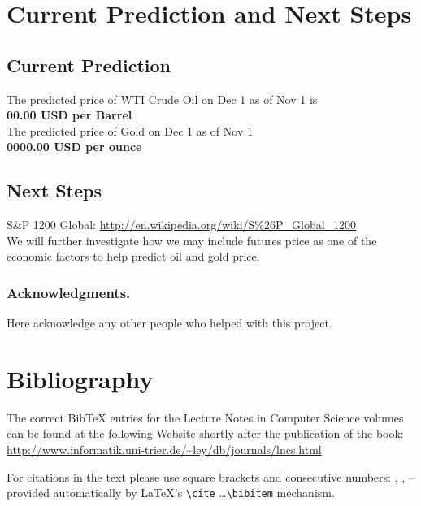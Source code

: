 \documentclass[runningheads]{llncs}
\begin{document}
\newpage

\section{Current Prediction and Next Steps}

\subsection {Current Prediction}
\noindent The predicted price of WTI Crude Oil on Dec 1 as of Nov 1 is \\
\textbf{00.00 USD per Barrel} \\

\noindent The predicted price of Gold on Dec 1 as of Nov 1 \\
\textbf{0000.00 USD per ounce} \\

\subsection {Next Steps}

S\&P 1200 Global: \url {http://en.wikipedia.org/wiki/S%26P_Global_1200} \\

\noindent We will further investigate how we may include futures price as one of the economic factors to help predict oil and gold price. \\


\subsubsection*{Acknowledgments.} Here acknowledge any other people who helped with this project.

\section{Bibliography}\label{references}

The correct BibTeX entries for the Lecture Notes in Computer Science
volumes can be found at the following Website shortly after the
publication of the book:
\url{http://www.informatik.uni-trier.de/~ley/db/journals/lncs.html}

For citations in the text please use
square brackets and consecutive numbers: \cite{jour}, \cite{lncschap},
\cite{proceeding1} -- provided automatically
by \LaTeX 's \verb|\cite| \dots\verb|\bibitem| mechanism.
\end{document}
